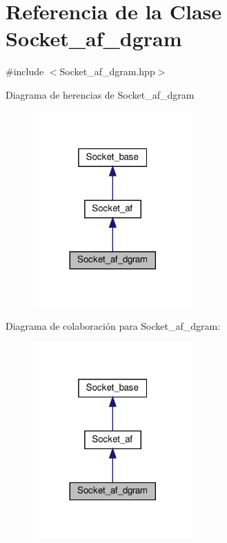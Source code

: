 \hypertarget{classSocket__af__dgram}{}\section{Referencia de la Clase Socket\+\_\+af\+\_\+dgram}
\label{classSocket__af__dgram}


{\ttfamily \#include $<$Socket\+\_\+af\+\_\+dgram.\+hpp$>$}



Diagrama de herencias de Socket\+\_\+af\+\_\+dgram\nopagebreak
\begin{figure}[H]
\begin{center}
\leavevmode
\includegraphics[width=173pt]{classSocket__af__dgram__inherit__graph}
\end{center}
\end{figure}


Diagrama de colaboración para Socket\+\_\+af\+\_\+dgram\+:\nopagebreak
\begin{figure}[H]
\begin{center}
\leavevmode
\includegraphics[width=173pt]{classSocket__af__dgram__coll__graph}
\end{center}
\end{figure}

